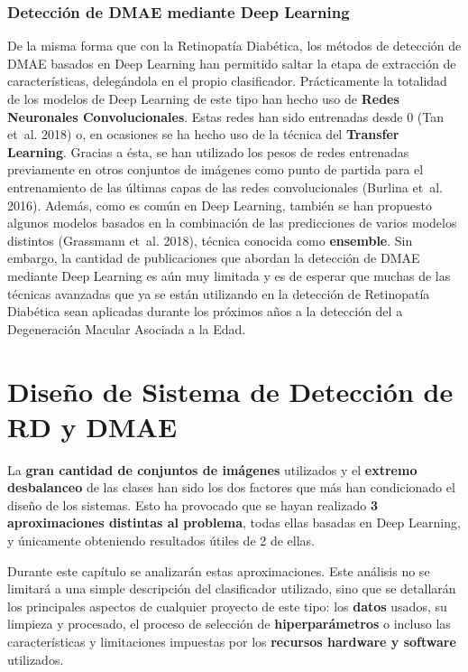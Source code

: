 \documentclass[
  12pt,
  spanish,
  a4paperpaper,
]{report}
\begin{document}
\hypertarget{detecciuxf3n-de-dmae-mediante-deep-learning}{%
\subsection{Detección de DMAE mediante Deep
Learning}\label{detecciuxf3n-de-dmae-mediante-deep-learning}}

De la misma forma que con la Retinopatía Diabética, los métodos de
detección de DMAE basados en Deep Learning han permitido saltar la etapa
de extracción de características, delegándola en el propio clasificador.
Prácticamente la totalidad de los modelos de Deep Learning de este tipo
han hecho uso de \textbf{Redes Neuronales Convolucionales}. Estas redes
han sido entrenadas desde 0 (Tan et~al. 2018) o, en ocasiones se ha
hecho uso de la técnica del \textbf{Transfer Learning}. Gracias a ésta,
se han utilizado los pesos de redes entrenadas previamente en otros
conjuntos de imágenes como punto de partida para el entrenamiento de las
últimas capas de las redes convolucionales (Burlina et~al. 2016).
Además, como es común en Deep Learning, también se han propuesto algunos
modelos basados en la combinación de las predicciones de varios modelos
distintos (Grassmann et~al. 2018), técnica conocida como
\textbf{ensemble}. Sin embargo, la cantidad de publicaciones que abordan
la detección de DMAE mediante Deep Learning es aún muy limitada y es de
esperar que muchas de las técnicas avanzadas que ya se están utilizando
en la detección de Retinopatía Diabética sean aplicadas durante los
próximos años a la detección del a Degeneración Macular Asociada a la
Edad.

\hypertarget{sistema}{%
\chapter{Diseño de Sistema de Detección de RD y DMAE}\label{sistema}}

La \textbf{gran cantidad de conjuntos de imágenes} utilizados y el
\textbf{extremo desbalanceo} de las clases han sido los dos factores que
más han condicionado el diseño de los sistemas. Esto ha provocado que se
hayan realizado \textbf{3 aproximaciones distintas al problema}, todas
ellas basadas en Deep Learning, y únicamente obteniendo resultados
útiles de 2 de ellas.

Durante este capítulo se analizarán estas aproximaciones. Este análisis
no se limitará a una simple descripción del clasificador utilizado, sino
que se detallarán los principales aspectos de cualquier proyecto de este
tipo: los \textbf{datos} usados, su limpieza y procesado, el proceso de
selección de \textbf{hiperparámetros} o incluso las características y
limitaciones impuestas por los \textbf{recursos hardware y software}
utilizados.
\end{document}
